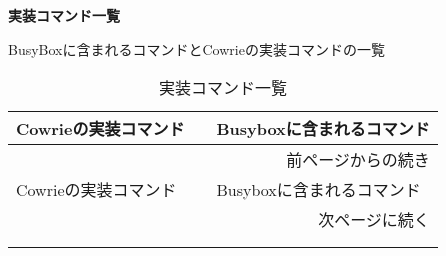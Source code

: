  
\begin{center}
\large{\textbf{実装コマンド一覧}}
\end{center}

BusyBoxに含まれるコマンドとCowrieの実装コマンドの一覧
 
\begin{longtable}{p{100mm}p{100mm}}
  \caption{実装コマンド一覧}
  \label{table:command} \\
  \hline
  Cowrieの実装コマンド　& Busyboxに含まれるコマンド \\ \hline\hline
  \endfirsthead
  \multicolumn{2}{r}{前ページからの続き} \\ \hline
  Cowrieの実装コマンド　& Busyboxに含まれるコマンド \\ \hline\hline
  \endhead
  \hline
  \multicolumn{2}{r}{次ページに続く} \\
  \endfoot
  \hline
  \multicolumn{2}{r}{以上} \\
  \endlastfoot


\end{longtable}
